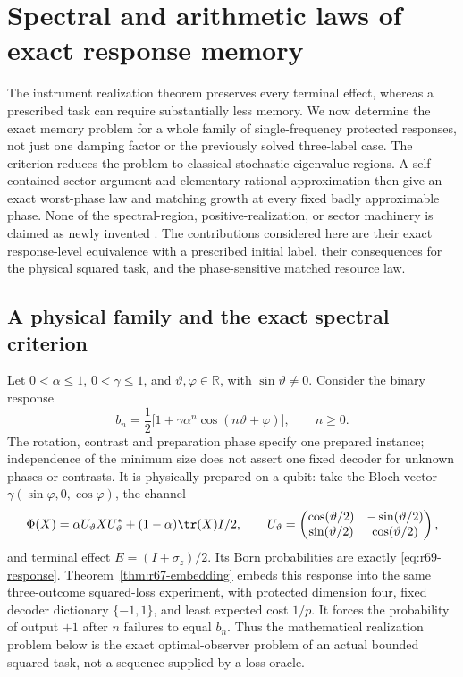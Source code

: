 \section{Spectral and arithmetic laws of exact response memory}\label{sec:r69-spectral}
The instrument realization theorem preserves every terminal effect, whereas a prescribed task can require substantially less memory. We now determine the exact memory problem for a whole family of single-frequency protected responses, not just one damping factor or the previously solved three-label case. The criterion reduces the problem to classical stochastic eigenvalue regions. A self-contained sector argument and elementary rational approximation then give an exact worst-phase law and matching growth at every fixed badly approximable phase. None of the spectral-region, positive-realization, or sector machinery is claimed as newly invented \cite{DmitrievDynkin46,JohnsonPaparella17,KirklandSmigoc22}. The contributions considered here are their exact response-level equivalence with a prescribed initial label, their consequences for the physical squared task, and the phase-sensitive matched resource law.

\subsection{A physical family and the exact spectral criterion}
Let $0<\alpha\le1$, $0<\gamma\le1$, and $\vartheta,\varphi\in\mathbb R$, with $\sin\vartheta\ne0$. Consider the binary response
\begin{equation}\label{eq:r69-response}
 b_n=\frac12\bigl[1+\gamma\alpha^n\cos(n\vartheta+\varphi)\bigr],
 \qquad n\ge0.
\end{equation}
The rotation, contrast and preparation phase specify one prepared instance; independence of the minimum size does not assert one fixed decoder for unknown phases or contrasts. It is physically prepared on a qubit: take the Bloch vector
$\gamma(\sin\varphi,0,\cos\varphi)$, the channel
\[
 \Phi(X)=\alpha U_\vartheta XU_\vartheta^*
               +(1-\alpha)\tr(X)I/2,\qquad
 U_\vartheta=\begin{pmatrix}\cos(\vartheta/2)&-\sin(\vartheta/2)\\
                  \sin(\vartheta/2)&\cos(\vartheta/2)\end{pmatrix},
\]
and terminal effect $E=(I+\sigma_z)/2$. Its Born probabilities are exactly \eqref{eq:r69-response}. Theorem~\ref{thm:r67-embedding} embeds this response into the same three-outcome squared-loss experiment, with protected dimension four, fixed decoder dictionary $\{-1,1\}$, and least expected cost $1/p$. It forces the probability of output $+1$ after $n$ failures to equal $b_n$. Thus the mathematical realization problem below is the exact optimal-observer problem of an actual bounded squared task, not a sequence supplied by a loss oracle.

